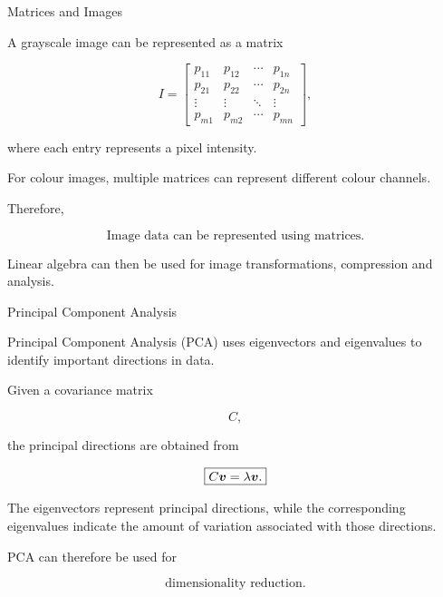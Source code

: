 
\begin{frame}{Matrices and Images}

A grayscale image can be represented as a matrix

\[
I=
\begin{bmatrix}
p_{11}&p_{12}&\cdots&p_{1n}\\
p_{21}&p_{22}&\cdots&p_{2n}\\
\vdots&\vdots&\ddots&\vdots\\
p_{m1}&p_{m2}&\cdots&p_{mn}
\end{bmatrix},
\]

where each entry represents a pixel intensity.

For colour images, multiple matrices can represent
different colour channels.

\vspace{0.4cm}

Therefore,

\[
\boxed{
\text{Image data can be represented using matrices.}
}
\]

Linear algebra can then be used for image transformations,
compression and analysis.

\end{frame}



\begin{frame}{Principal Component Analysis}

Principal Component Analysis (PCA) uses eigenvectors and
eigenvalues to identify important directions in data.

Given a covariance matrix

\[
C,
\]

the principal directions are obtained from

\[
\boxed{
C\bm{v}=\lambda\bm{v}.
}
\]

The eigenvectors represent principal directions, while
the corresponding eigenvalues indicate the amount of
variation associated with those directions.

PCA can therefore be used for

\[
\boxed{
\text{dimensionality reduction}.
}
\]

\end{frame}


